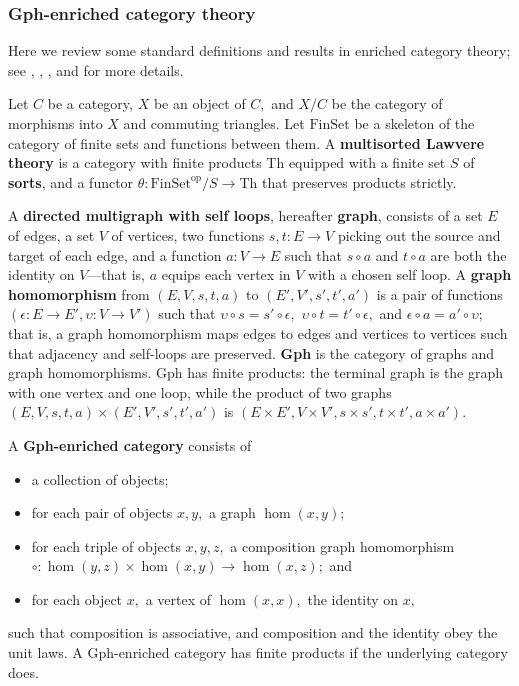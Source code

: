 \documentclass[submission,copyright,creativecommons]{eptcs}
\newcommand{\maps}{\colon}
\newcommand{\Th}{\mathrm{Th}}
\newcommand{\FinSet}{\mathrm{FinSet}}
\newcommand{\op}{\mathrm{op}}
\begin{document}
\subsubsection{Gph-enriched category theory}
\label{GphReview}

Here we review some standard definitions and results in enriched category theory; see \cite{CIS-335497}, \cite{Power99EnrichedLawvereTheories}, \cite{LackR11}, and \cite{Trimble} for more details.

Let $C$ be a category, $X$ be an object of $C,$ and $X/C$ be the category of morphisms into $X$ and commuting triangles.  Let $\FinSet$ be a skeleton of the category of finite sets and functions between them.  A {\bf multisorted Lawvere theory} is a category with finite products Th equipped with a finite set $S$ of {\bf sorts}, and a functor $\theta\maps \FinSet^{\op}/S \to \Th$ that preserves products strictly.

A {\bf directed multigraph with self loops}, hereafter {\bf graph}, consists of a set $E$ of edges, a set $V$ of vertices, two functions $s,t\maps E \to V$ picking out the source and target of each edge, and a function $a\maps V \to E$ such that $s\circ a$ and $t \circ a$ are both the identity on $V$---that is, $a$ equips each vertex in $V$ with a chosen self loop.  A {\bf graph homomorphism} from $(E, V, s, t, a)$ to $(E', V', s', t', a')$ is a pair of functions $(\epsilon\maps E \to E', \upsilon\maps V \to V')$ such that $\upsilon\circ s = s' \circ \epsilon,$ $\upsilon\circ t = t' \circ \epsilon,$ and $\epsilon \circ a = a' \circ \upsilon;$ that is, a graph homomorphism maps edges to edges and vertices to vertices such that adjacency and self-loops are preserved.  {\bf Gph} is the category of graphs and graph homomorphisms.  Gph has finite products: the terminal graph is the graph with one vertex and one loop, while the product of two graphs $(E, V, s, t, a) \times (E', V', s', t', a')$ is $(E \times E', V \times V', s \times s', t\times t', a \times a').$

A {\bf Gph-enriched category} consists of
\begin{itemize}
  \item a collection of objects;
  \item for each pair of objects $x, y,$ a graph $\hom(x,y);$
  \item for each triple of objects $x, y, z,$ a composition graph homomorphism $\circ\maps \hom(y, z) \times \hom(x, y) \to \hom(x, z);$ and
  \item for each object $x,$ a vertex of $\hom(x, x),$ the identity on $x,$
\end{itemize}
such that composition is associative, and composition and the identity obey the unit laws.  A Gph-enriched category has finite products if the underlying category does.
\end{document}
